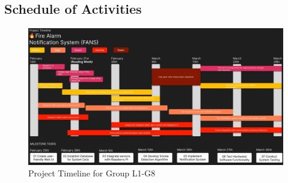 \subsection{Schedule of Activities}

\begin{figure}[H]
    \centering
    \includegraphics[width=\linewidth]{../assets/SYSC3010_ProjectTimeline.jpg}
    \caption{Project Timeline for Group L1-G8}
\end{figure}

